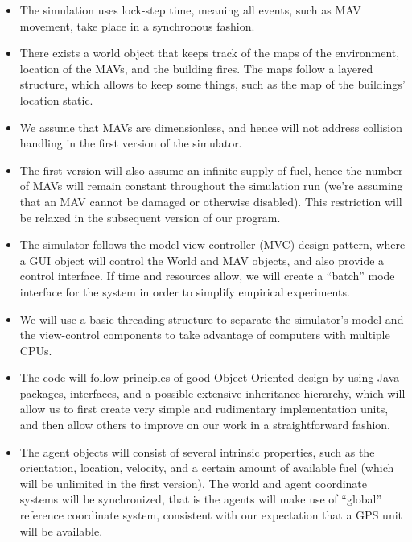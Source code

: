 \documentclass{article}
\begin{document}
\begin{itemize}
\item The simulation uses lock-step time, meaning all events, such as MAV movement, take place in a synchronous fashion.

\item There exists a world object that keeps track of the maps of the environment, location of the MAVs, and the building fires.  The maps follow a layered structure, which allows to keep some things, such as the map of the buildings' location static.

\item We assume that MAVs are dimensionless, and hence will not address collision handling in the first version of the simulator.
 
\item The first version will also assume an infinite supply of fuel, hence the number of MAVs will remain constant throughout the simulation run (we're assuming that an MAV cannot be damaged or otherwise disabled).  This restriction will be relaxed in the subsequent version of our program.

\item The simulator follows the model-view-controller (MVC) design pattern, where a GUI object will control the World and MAV objects, and also provide a control interface.  If time and resources allow, we will create a ``batch'' mode interface for the system in order to simplify empirical experiments.

\item We will use a basic threading structure to separate the simulator's model and the view-control components to take advantage of computers with multiple CPUs.

\item The code will follow principles of good Object-Oriented design by using Java packages, interfaces, and a possible extensive inheritance hierarchy, which will allow us to first create very simple and rudimentary implementation units, and then allow others to improve on our work in a straightforward fashion.

\item The agent objects will consist of several intrinsic properties, such as the orientation, location, velocity, and a certain amount of available fuel (which will be unlimited in the first version).  The world and agent coordinate systems will be synchronized, that is the agents will make use of ``global'' reference coordinate system, consistent with our expectation that a GPS unit will be available.


\end{itemize}
\end{document}
